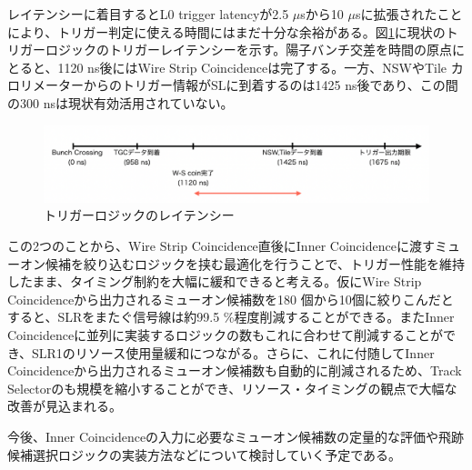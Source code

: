レイテンシーに着目するとL0 trigger latencyが2.5 $\mu$sから10 $\mu$sに拡張されたことにより、トリガー判定に使える時間にはまだ十分な余裕がある。図\ref{Trigger_latency_memo}に現状のトリガーロジックのトリガーレイテンシーを示す。陽子バンチ交差を時間の原点にとると、1120 ns後にはWire Strip Coincidenceは完了する。一方、NSWやTile カロリメーターからのトリガー情報がSLに到着するのは1425 ns後であり、この間の300 nsは現状有効活用されていない。

\begin{figure} 
\centering
\includegraphics[width=16cm]{fig/SL/Trigger_latency_memo.png}
\caption[トリガーロジックのレイテンシー]{トリガーロジックのレイテンシー}
\label{Trigger_latency_memo}
\end{figure}

この2つのことから、Wire Strip Coincidence直後にInner Coincidenceに渡すミューオン候補を絞り込むロジックを挟む最適化を行うことで、トリガー性能を維持したまま、タイミング制約を大幅に緩和できると考える。仮にWire Strip Coincidenceから出力されるミューオン候補数を180 個から10個に絞りこんだとすると、SLRをまたぐ信号線は約99.5 \%程度削減することができる。またInner Coincidenceに並列に実装するロジックの数もこれに合わせて削減することができ、SLR1のリソース使用量緩和につながる。さらに、これに付随してInner Coincidenceから出力されるミューオン候補数も自動的に削減されるため、Track Selectorのも規模を縮小することができ、リソース・タイミングの観点で大幅な改善が見込まれる。

今後、Inner Coincidenceの入力に必要なミューオン候補数の定量的な評価や飛跡候補選択ロジックの実装方法などについて検討していく予定である。